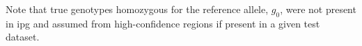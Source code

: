 \begin{table}[tbp]
\begin{threeparttable}

\begin{tablenotes}[para]\footnotesize
Note that true genotypes homozygous for the reference allele, $g_0$, were not present in \gls{ipg} and assumed from high-confidence regions if present in a given test dataset.
\end{tablenotes}
\end{threeparttable}
\end{table}

